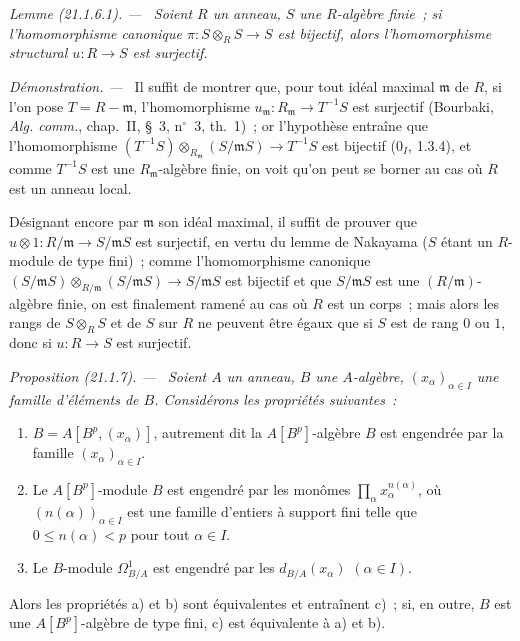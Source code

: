 \documentclass[10pt,oneside]{book}
\makeatletter
\newcommand{\setmanualcurrentlabel}[1]{\def\@currentlabel{#1}}
\newenvironment{proposition}[1][]{%
  \setmanualcurrentlabel{#1}\par\medskip\noindent\itshape Proposition (#1). ---\ }{\par}
\newenvironment{lemma}[1][]{%
  \setmanualcurrentlabel{#1}\par\medskip\noindent\itshape Lemme (#1). ---\ }{\par}
\newenvironment{proof}{%
  \par\medskip\noindent\textit{Démonstration. ---\ }}{\par}
\makeatother
\begin{document}
\begin{lemma}[21.1.6.1]
\label{0.21.1.6.1-fr}
Soient $R$ un anneau, $S$ une $R$-algèbre finie~; si l'homomorphisme
canonique $\pi:S\otimes_R S\to S$ est bijectif, alors l'homomorphisme
structural $u:R\to S$ est surjectif.
\end{lemma}

\begin{proof}
Il suffit de montrer que, pour tout idéal maximal $\mathfrak m$ de $R$, si
l'on pose $T=R-\mathfrak m$, l'homomorphisme
$u_{\mathfrak m}:R_{\mathfrak m}\to T^{-1}S$ est surjectif (Bourbaki,
\emph{Alg. comm.}, chap.~II, §~3, n$^\circ$~3, th.~1)~; or l'hypothèse
entraîne que l'homomorphisme
$(T^{-1}S)\otimes_{R_{\mathfrak m}}(S/\mathfrak mS)\to T^{-1}S$
est bijectif (0$_I$, 1.3.4), et comme $T^{-1}S$ est une
$R_{\mathfrak m}$-algèbre finie, on voit qu'on peut se borner au cas où
$R$ est un anneau local.

Désignant encore par $\mathfrak m$ son idéal maximal, il suffit de prouver que
$u\otimes1:R/\mathfrak m\to S/\mathfrak mS$ est surjectif, en vertu du
lemme de Nakayama ($S$ étant un $R$-module de type fini)~; comme
l'homomorphisme canonique
$(S/\mathfrak mS)\otimes_{R/\mathfrak m}(S/\mathfrak mS)\to S/\mathfrak mS$
est bijectif et que $S/\mathfrak mS$ est une $(R/\mathfrak m)$-algèbre finie,
on est finalement ramené au cas où $R$ est un corps~; mais alors les rangs de
$S\otimes_R S$ et de $S$ sur $R$ ne peuvent être égaux que si $S$ est de rang
$0$ ou $1$, donc si $u:R\to S$ est surjectif.
\end{proof}

\begin{proposition}[21.1.7]
\label{0.21.1.7-fr}
Soient $A$ un anneau, $B$ une $A$-algèbre, $(x_\alpha)_{\alpha\in I}$ une
famille d'éléments de $B$. Considérons les propriétés suivantes~:
\begin{enumerate}
  \item[a)] $B=A[B^p,(x_\alpha)]$, autrement dit la $A[B^p]$-algèbre
  $B$ est engendrée par la famille $(x_\alpha)_{\alpha\in I}$.
  \item[b)] Le $A[B^p]$-module $B$ est engendré par les monômes
  $\prod_\alpha x_\alpha^{n(\alpha)}$, où $(n(\alpha))_{\alpha\in I}$ est
  une famille d'entiers à support fini telle que $0\leq n(\alpha)<p$ pour
  tout $\alpha\in I$.
  \item[c)] Le $B$-module $\Omega^1_{B/A}$ est engendré par les
  $d_{B/A}(x_\alpha)$ $(\alpha\in I)$.
\end{enumerate}
Alors les propriétés a) et b) sont équivalentes et entraînent c)~; si, en
outre, $B$ est une $A[B^p]$-algèbre de type fini, c) est équivalente à a) et b).
\end{proposition}
\end{document}
